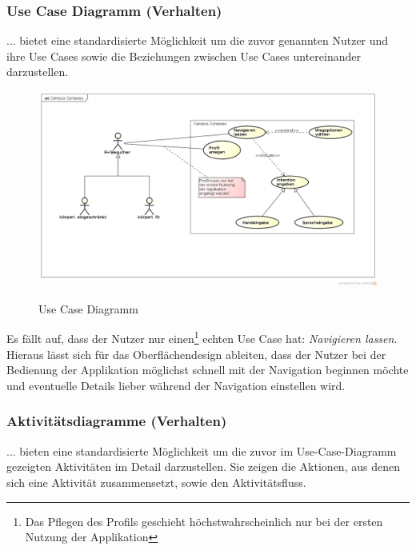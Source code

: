 \subsubsection*{Use Case Diagramm (Verhalten)}
... bietet eine standardisierte Möglichkeit um die zuvor genannten Nutzer und ihre Use Cases sowie die Beziehungen zwischen Use Cases untereinander darzustellen.

\begin{figure}[hbt]
  \centering
  \includegraphics[width=\linewidth]{img/use-case-diagram.png}
  \label{img:use-case-diagramm}
  \caption{Use Case Diagramm}
\end{figure}

\noindent Es fällt auf, dass der Nutzer nur einen\footnote{Das Pflegen des Profils geschieht höchstwahrscheinlich nur bei der ersten Nutzung der Applikation} echten Use Case hat: \emph{Navigieren lassen}. Hieraus lässt sich für das Oberflächendesign ableiten, dass der Nutzer bei der Bedienung der Applikation möglichst schnell mit der Navigation beginnen möchte und eventuelle Details lieber während der Navigation einstellen wird. 

\subsubsection*{Aktivitätsdiagramme (Verhalten)}
... bieten eine standardisierte Möglichkeit um die zuvor im Use-Case-Diagramm gezeigten Aktivitäten im Detail darzustellen. Sie zeigen die Aktionen, aus denen sich eine Aktivität zusammensetzt, sowie den Aktivitätsfluss.


